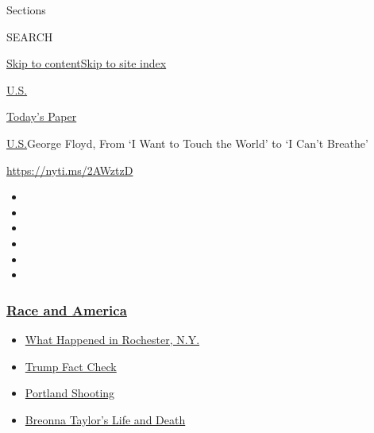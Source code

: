 Sections

SEARCH

\protect\hyperlink{site-content}{Skip to
content}\protect\hyperlink{site-index}{Skip to site index}

\href{https://www.nytimes3xbfgragh.onion/section/us}{U.S.}

\href{https://myaccount.nytimes3xbfgragh.onion/auth/login?response_type=cookie\&client_id=vi}{}

\href{https://www.nytimes3xbfgragh.onion/section/todayspaper}{Today's
Paper}

\href{/section/us}{U.S.}\textbar{}George Floyd, From `I Want to Touch
the World' to `I Can't Breathe'

\url{https://nyti.ms/2AWztzD}

\begin{itemize}
\item
\item
\item
\item
\item
\item
\end{itemize}

\hypertarget{race-and-america}{%
\subsubsection{\texorpdfstring{\href{https://www.nytimes3xbfgragh.onion/news-event/george-floyd-protests-minneapolis-new-york-los-angeles?name=styln-george-floyd\&region=TOP_BANNER\&block=storyline_menu_recirc\&action=click\&pgtype=Article\&impression_id=c9af96a0-f298-11ea-9965-c97ade083f55\&variant=undefined}{Race
and America}}{Race and America}}\label{race-and-america}}

\begin{itemize}
\tightlist
\item
  \href{https://www.nytimes3xbfgragh.onion/2020/09/04/nyregion/rochester-police-daniel-prude.html?name=styln-george-floyd\&region=TOP_BANNER\&block=storyline_menu_recirc\&action=click\&pgtype=Article\&impression_id=c9af96a1-f298-11ea-9965-c97ade083f55\&variant=undefined}{What
  Happened in Rochester, N.Y.}
\item
  \href{https://www.nytimes3xbfgragh.onion/2020/09/01/us/politics/trump-fact-check-protests.html?name=styln-george-floyd\&region=TOP_BANNER\&block=storyline_menu_recirc\&action=click\&pgtype=Article\&impression_id=c9af96a2-f298-11ea-9965-c97ade083f55\&variant=undefined}{Trump
  Fact Check}
\item
  \href{https://www.nytimes3xbfgragh.onion/2020/08/30/us/portland-shooting-explained.html?name=styln-george-floyd\&region=TOP_BANNER\&block=storyline_menu_recirc\&action=click\&pgtype=Article\&impression_id=c9af96a3-f298-11ea-9965-c97ade083f55\&variant=undefined}{Portland
  Shooting}
\item
  \href{https://www.nytimes3xbfgragh.onion/2020/08/30/us/breonna-taylor-police-killing.html?name=styln-george-floyd\&region=TOP_BANNER\&block=storyline_menu_recirc\&action=click\&pgtype=Article\&impression_id=c9af96a4-f298-11ea-9965-c97ade083f55\&variant=undefined}{Breonna
  Taylor's Life and Death}
\end{itemize}

